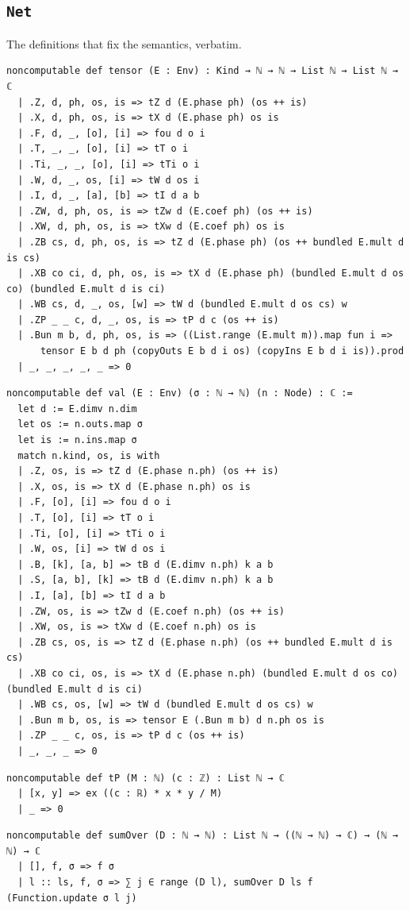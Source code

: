 \subsection{\texttt{Net}}
The definitions that fix the semantics, verbatim.
\begin{lstlisting}[style=leancore]
noncomputable def tensor (E : Env) : Kind → ℕ → ℕ → List ℕ → List ℕ → ℂ
  | .Z, d, ph, os, is => tZ d (E.phase ph) (os ++ is)
  | .X, d, ph, os, is => tX d (E.phase ph) os is
  | .F, d, _, [o], [i] => fou d o i
  | .T, _, _, [o], [i] => tT o i
  | .Ti, _, _, [o], [i] => tTi o i
  | .W, d, _, os, [i] => tW d os i
  | .I, d, _, [a], [b] => tI d a b
  | .ZW, d, ph, os, is => tZw d (E.coef ph) (os ++ is)
  | .XW, d, ph, os, is => tXw d (E.coef ph) os is
  | .ZB cs, d, ph, os, is => tZ d (E.phase ph) (os ++ bundled E.mult d is cs)
  | .XB co ci, d, ph, os, is => tX d (E.phase ph) (bundled E.mult d os co) (bundled E.mult d is ci)
  | .WB cs, d, _, os, [w] => tW d (bundled E.mult d os cs) w
  | .ZP _ _ c, d, _, os, is => tP d c (os ++ is)
  | .Bun m b, d, ph, os, is => ((List.range (E.mult m)).map fun i =>
      tensor E b d ph (copyOuts E b d i os) (copyIns E b d i is)).prod
  | _, _, _, _, _ => 0
\end{lstlisting}
\begin{lstlisting}[style=leancore]
noncomputable def val (E : Env) (σ : ℕ → ℕ) (n : Node) : ℂ :=
  let d := E.dimv n.dim
  let os := n.outs.map σ
  let is := n.ins.map σ
  match n.kind, os, is with
  | .Z, os, is => tZ d (E.phase n.ph) (os ++ is)
  | .X, os, is => tX d (E.phase n.ph) os is
  | .F, [o], [i] => fou d o i
  | .T, [o], [i] => tT o i
  | .Ti, [o], [i] => tTi o i
  | .W, os, [i] => tW d os i
  | .B, [k], [a, b] => tB d (E.dimv n.ph) k a b
  | .S, [a, b], [k] => tB d (E.dimv n.ph) k a b
  | .I, [a], [b] => tI d a b
  | .ZW, os, is => tZw d (E.coef n.ph) (os ++ is)
  | .XW, os, is => tXw d (E.coef n.ph) os is
  | .ZB cs, os, is => tZ d (E.phase n.ph) (os ++ bundled E.mult d is cs)
  | .XB co ci, os, is => tX d (E.phase n.ph) (bundled E.mult d os co) (bundled E.mult d is ci)
  | .WB cs, os, [w] => tW d (bundled E.mult d os cs) w
  | .Bun m b, os, is => tensor E (.Bun m b) d n.ph os is
  | .ZP _ _ c, os, is => tP d c (os ++ is)
  | _, _, _ => 0
\end{lstlisting}
\begin{lstlisting}[style=leancore]
noncomputable def tP (M : ℕ) (c : ℤ) : List ℕ → ℂ
  | [x, y] => ex ((c : ℝ) * x * y / M)
  | _ => 0
\end{lstlisting}
\begin{lstlisting}[style=leancore]
noncomputable def sumOver (D : ℕ → ℕ) : List ℕ → ((ℕ → ℕ) → ℂ) → (ℕ → ℕ) → ℂ
  | [], f, σ => f σ
  | l :: ls, f, σ => ∑ j ∈ range (D l), sumOver D ls f (Function.update σ l j)
\end{lstlisting}
